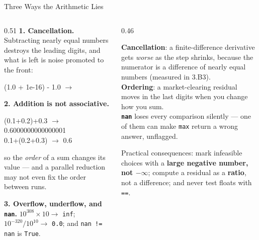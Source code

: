 \begin{frame}{Three Ways the Arithmetic Lies}
\begin{columns}[T]
\begin{column}{0.51\textwidth}
\small
\textbf{1. Cancellation.} Subtracting nearly equal numbers destroys the leading digits, and what is left is noise promoted to the front:
\begin{center}\ttfamily\scriptsize
(1.0 + 1e-16) - 1.0 \;$\to$
\end{center}
\textbf{2. Addition is not associative.}
\begin{center}\ttfamily\scriptsize
(0.1+0.2)+0.3 $\to$ 0.6000000000000001\\
0.1+(0.2+0.3) $\to$ 0.6
\end{center}
so the \emph{order} of a sum changes its value --- and a parallel reduction may not even fix the order between runs.
\medskip

\textbf{3. Overflow, underflow, and \texttt{nan}.} $10^{308}\!\times\!10\to$ \texttt{inf}; $10^{-320}/10^{10}\to$ \texttt{0.0}; and \texttt{nan != nan} is \texttt{True}.
\end{column}
\begin{column}{0.46\textwidth}
\begin{cautionbox}[title=\textbf{Where each one finds you}]\footnotesize
\textbf{Cancellation}: a finite-difference derivative gets \emph{worse} as the step shrinks, because the numerator is a difference of nearly equal numbers (measured in 3.B3).\\[1mm]
\textbf{Ordering}: a market-clearing residual moves in the last digits when you change how you sum.\\[1mm]
\textbf{\texttt{nan}} loses every comparison silently --- one of them can make \texttt{max} return a wrong answer, unflagged.
\end{cautionbox}
\medskip
\begin{takeawaybox}\footnotesize
Practical consequences: mark infeasible choices with a \textbf{large negative number, not $-\infty$}; compute a residual as a \textbf{ratio}, not a difference; and never test floats with \texttt{==}.
\end{takeawaybox}
\end{column}
\end{columns}
\end{frame}

